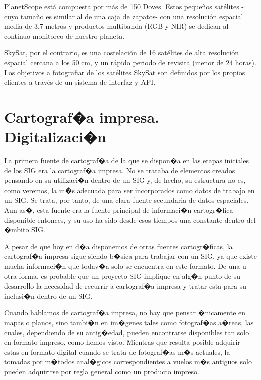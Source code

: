 \begin{itemize}
	PlanetScope está compuesta por más de 150 Doves. Estos pequeños satélites -cuyo tamaño es similar al de una caja de zapatos- con una resolución espacial media de 3.7 metros y productos multibanda (RGB y NIR) se dedican al continuo monitoreo de nuestro planeta. 
	
	SkySat, por el contrario, es una costelación de 16 satélites de alta resolución espacial cercana a los 50 cm, y un rápido periodo de revisita (menor de 24 horas). Los objetivos a fotografiar de los satélites SkySat son definidos por los propios clientes a través de un sistema de interfaz y API. 
\end{itemize}

\section{Cartograf�a impresa. Digitalizaci�n}


La primera fuente de cartograf�a de la que se dispon�a en las etapas iniciales de los SIG era la  cartograf�a impresa. No se trataba de elementos creados pensando en su utilizaci�n dentro de un SIG y, de hecho, su estructura no es, como veremos, la m�s adecuada para ser incorporados como datos de trabajo en un SIG. Se trata, por tanto, de una clara fuente secundaria de datos espaciales. Aun as�, esta fuente era la fuente principal de informaci�n cartogr�fica disponible entonces, y su uso ha sido desde esos tiempos una constante dentro del �mbito SIG.

A pesar de que hoy en d�a disponemos de otras fuentes cartogr�ficas, la cartograf�a impresa sigue siendo b�sica para trabajar con un SIG, ya que existe mucha informaci�n que todav�a solo se encuentra en este formato. De una u otra forma, es probable que un proyecto SIG implique en alg�n punto de su desarrollo la necesidad de recurrir a cartograf�a impresa y tratar esta para su inclusi�n dentro de un SIG.

Cuando hablamos de cartograf�a impresa, no hay que pensar �nicamente en mapas o planos, sino tambi�n en im�genes tales como fotograf�as a�reas, las cuales, dependiendo de su antig�edad, pueden encontrarse disponibles tan solo en formato impreso, como hemos visto. Mientras que resulta posible adquirir estas en formato digital cuando se trata de fotograf�as m�s actuales, la tomadas por m�todos anal�gicos correspondientes a vuelos m�s antiguos solo pueden adquirirse por regla general como un producto impreso.

